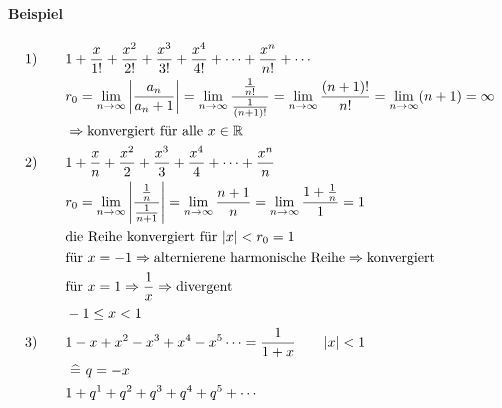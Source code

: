\paragraph{Beispiel}

\begin{align*}
	1)\qquad & 1 + \frac{x}{1!} + \frac{x^2}{2!} + \frac{x^3}{3!} + \frac{x^4}{4!} + \cdots + \frac{x^n}{n!} + \cdots                                                                                \\
	         & r_0 = \lim_{n \rightarrow{} \infty} \left| \frac{a_n}{a_n + 1} \right| = \lim_{n \rightarrow{} \infty} \frac{\frac{1}{n!}}{\frac{1}{(n + 1)!}} = \lim_{n \rightarrow{} \infty} \frac{(n+1)!}{n!} = \lim_{n \rightarrow{} \infty} (n + 1) = \infty \\
	         & \Rightarrow \text{konvergiert für alle } x \in \mathbb{R}                                                                                                                             \\
	2)\qquad & 1 + \frac{x}{n} + \frac{x^2}{2} + \frac{x^3}{3} + \frac{x^4}{4} + \cdots + \frac{x^n}{n}                                                                                              \\
	         & r_0 = \lim_{n \rightarrow{} \infty} \left| \frac{\frac{1}{n}}{\frac{1}{n + 1}} \right| = \lim_{n \rightarrow{} \infty} \frac{n + 1}{n} = \lim_{n \rightarrow{} \infty} \frac{1 + \frac{1}{n}}{1} = 1                               \\
	         & \text{die Reihe konvergiert für } |x| < r_0 = 1                                                                                                                                       \\
	         & \text{für } x = -1 \Rightarrow \text{alternierene harmonische Reihe} \Rightarrow \text{konvergiert}                                                                                   \\
	         & \text{für } x = 1 \Rightarrow \frac{1}{x} \Rightarrow \text{divergent}                                                                                                                \\
	         & -1 \leq x < 1                                                                                                                                                                         \\
	3)\qquad & 1 - x + x^2 - x^3 + x^4 - x^5 \cdots = \frac{1}{1 + x} \qquad |x| < 1                                                                                                                 \\
	         & \ \widehat{=}\  q = -x                                                                                                                                                                    \\
	         & 1 + q^1 + q^2 + q^3 + q^4 + q^5 + \cdots
\end{align*}

